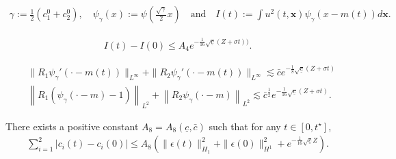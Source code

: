 \documentclass[10pt,a4paper]{amsart}
\newcommand{\bx}{\mathbf{x}}
\begin{document}
		\begin{align}\label{defi:orbital_stab}
		\gamma:=\frac12 \left( c_1^0 + c_2^0\right), \quad \psi_\gamma(x) := \psi \left( \frac{\sqrt{\gamma}}{2} x \right) \quad \text{and} \quad I(t) := \int u^2(t,\bx) \psi_{\gamma} \left( x - m(t)\right) d\bx. 
		\end{align}

			\begin{align}\label{eq:monotonic_mass}
				I(t)- I(0) \leq A_4  e^{-\frac1{16} \sqrt{\underline{c}}(Z+\sigma t))}.
			\end{align}

\begin{align} 
				&\| R_1 \psi_\gamma'\left( \cdot - m(t)\right) \|_{L^\infty} + \| R_2 \psi_\gamma'\left( \cdot - m(t)\right) \|_{L^\infty} \lesssim \bar{c} e^{-\frac18 \sqrt{\underline{c}} \left( Z + \sigma t\right)} \label{est:Rpsi} \\ 
				&\left\| R_1 \left(\psi_\gamma \left( \cdot - m\right) -1 \right) \right\|_{L^2} + \left\| R_2 \psi_\gamma\left( \cdot - m\right) \right\|_{L^2} \lesssim \bar{c}^\frac12 e^{- \frac1{16} \sqrt{\underline{c}}\left( Z + \sigma t\right)}. \label{ineq:R_psi_L2}
			\end{align}

	\begin{lemm}\label{lemm:quadra_control_error}
		There exists a positive constant $A_8=A_8(\underline{c}, \bar{c})$ such that for any $t\in [0, t^\star]$,
		\begin{align} \label{lemm:quadra_control_error.1}
			\sum_{i=1}^2 \left\vert c_i(t) -c_i(0) \right\vert \leq A_8  \left( \| \epsilon(t) \|_{H_1}^2 + \| \epsilon (0) \|_{H^1}^2 + e^{-\frac1{16} \sqrt{\underline{c}} Z}\right).
		\end{align}
	\end{lemm}
\end{document}
